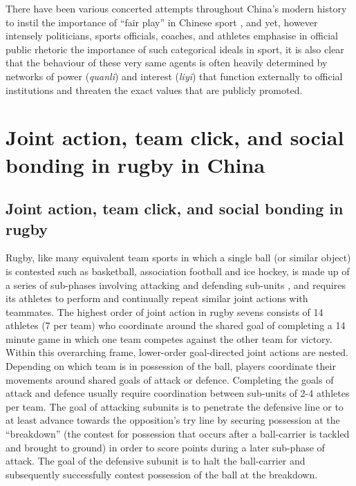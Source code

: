 There have been various concerted attempts throughout China's modern history to instil the importance of ``fair play'' in Chinese sport \citep{Morris2004,Brownell1995,Brownell2008}, and yet, however intensely politicians, sports officials, coaches, and athletes emphasise in official public rhetoric the importance of such categorical ideals in sport, it is also clear that the behaviour of these very same agents is often heavily determined by networks of power (\textit{quanli}) and interest (\textit{liyi}) that function externally to official institutions and threaten the exact values that are publicly promoted.







\section{Joint action, team click, and social bonding in rugby in China}



\subsection{Joint action, team click, and social bonding in rugby}

Rugby, like many equivalent team sports in which a single ball (or similar object) is contested such as basketball, association football and ice hockey, is made up of a series of sub-phases involving attacking and defending sub-units \citep{Passos2011}, and requires its athletes to perform and continually repeat similar joint actions with teammates.   The highest order of joint action in rugby sevens consists of 14 athletes (7 per team) who coordinate around the shared goal of completing a 14 minute game in which one team competes against the other team for victory.  Within this overarching frame, lower-order goal-directed joint actions are nested.  Depending on which team is in possession of the ball, players coordinate their movements around shared goals of attack or defence.  Completing the goals of attack and defence usually require coordination between sub-units of 2-4 athletes per team.  The goal of attacking subunits is to penetrate the defensive line or to at least advance towards the opposition's try line by securing possession at the ``breakdown'' (the contest for possession that occurs after a ball-carrier is tackled and brought to ground) in order to score points during a later sub-phase of attack.  The goal of the defensive subunit is to halt the ball-carrier and subsequently successfully contest possession of the ball at the breakdown.

